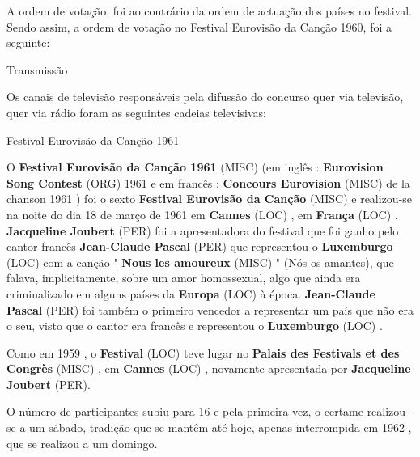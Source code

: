 \documentclass[12pt,a4paper]{article}
\begin{document}
A ordem de votação, foi ao contrário da ordem de actuação dos países no festival. Sendo assim, a ordem de votação no Festival Eurovisão da Canção 1960, foi a seguinte:



Transmissão

Os canais de televisão responsáveis pela difussão do concurso quer via televisão, quer via rádio foram as seguintes cadeias televisivas:



Festival Eurovisão da Canção 1961



O \textbf{Festival Eurovisão da Canção 1961} (MISC) (em inglês : \textbf{Eurovision Song Contest} (ORG) 1961 e em francês : \textbf{Concours Eurovision} (MISC) de la chanson 1961 ) foi o sexto \textbf{Festival Eurovisão da Canção} (MISC) e realizou-se na noite do dia 18 de março de 1961 em \textbf{Cannes} (LOC) , em \textbf{França} (LOC) . \textbf{Jacqueline Joubert} (PER) foi a apresentadora do festival que foi ganho pelo cantor francês \textbf{Jean-Claude Pascal} (PER) que representou o \textbf{Luxemburgo} (LOC) com a canção " \textbf{Nous les amoureux} (MISC) " (Nós os amantes), que falava, implicitamente, sobre um amor homossexual, algo que ainda era criminalizado em alguns países da \textbf{Europa} (LOC) à época. \textbf{Jean-Claude Pascal} (PER) foi também o primeiro vencedor a representar um país que não era o seu, visto que o cantor era francês e representou o \textbf{Luxemburgo} (LOC) .

Como em 1959 , o \textbf{Festival} (LOC) teve lugar no \textbf{Palais des Festivals et des Congrès} (MISC) , em \textbf{Cannes} (LOC) , novamente apresentada por \textbf{Jacqueline Joubert} (PER).

O número de participantes subiu para 16 e pela primeira vez, o certame realizou-se a um sábado, tradição que se mantêm até hoje, apenas interrompida em 1962 , que se realizou a um domingo.
\end{document}
